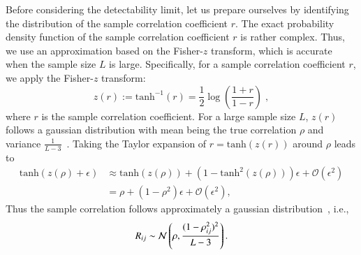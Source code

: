 \documentclass[a4paper,pre,superscriptaddress,floatfix,nofootinbib,twocolumn]{revtex4-1}
\begin{document}
Before considering the detectability limit, let us prepare ourselves by identifying the distribution of the sample correlation coefficient $r$.
The exact probability density function of the sample correlation coefficient $r$ is rather complex. Thus, we use an approximation based on the Fisher-$z$ transform, which is accurate when the sample size $L$ is large. Specifically, for a sample correlation coefficient $r$, we apply the Fisher-$z$ transform:
\begin{equation}
    z(r) := \text{tanh}^{-1}(r) = \frac{1}{2} \log \left( \frac{1+r}{1-r} \right) \; ,
\end{equation}
where $r$ is the sample correlation coefficient.
For a large sample size $L$, $z(r)$ follows a gaussian distribution with mean being the true correlation $\rho$ and variance $\frac{1}{L-3}$~\cite{hotelling1953new}.
Taking the Taylor expansion of $r=\text{tanh}(z(r))$ around $\rho$ leads to
\begin{align}
    \text{tanh}(z(\rho) + \epsilon) &\approx \text{tanh}(z(\rho)) + (1-\text{tanh}^2(z(\rho))) \epsilon + \mathcal{O}(\epsilon^2) \nonumber \\
    &=\rho + (1-\rho^2) \epsilon + \mathcal{O}(\epsilon^2),
\end{align}
Thus the sample correlation follows approximately a gaussian distribution~\cite{hotelling1953new}, i.e.,
\begin{equation}
    R_{ij} \sim {\cal N}\left(\rho, \frac{(1-\rho^2_{ij})^2}{L-3}\right). \label{eq:hotelling_dist}
\end{equation}
\end{document}
